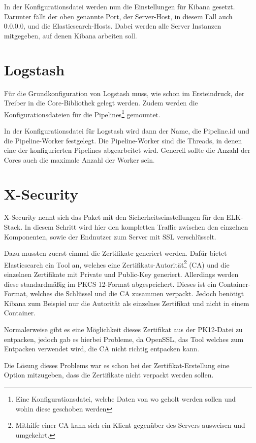 In der Konfigurationsdatei werden nun die Einstellungen für Kibana gesetzt. Darunter fällt der oben genannte Port, der Server-Host, in diesem Fall auch 0.0.0.0, und die Elasticsearch-Hosts. Dabei werden alle Server Instanzen mitgegeben, auf denen Kibana arbeiten soll. 

\section{Logstash}

Für die Grundkonfiguration von Logstash muss, wie schon im Ersteindruck, der Treiber in die Core-Bibliothek gelegt werden. Zudem werden die Konfigurationsdateien für die Pipelines\footnote{Eine Konfigurationsdatei, welche Daten von wo geholt werden sollen und wohin diese geschoben werden} gemountet.

In der Konfigurationsdatei für Logstash wird dann der Name, die Pipeline.id und die Pipeline-Worker festgelegt. Die Pipeline-Worker sind die Threads, in denen eine der konfigurierten Pipelines abgearbeitet wird. Generell sollte die Anzahl der Cores auch die maximale Anzahl der Worker sein.


\section{X-Security}

X-Security nennt sich das Paket mit den Sicherheitseinstellungen für den ELK-Stack. In diesem Schritt wird hier den kompletten Traffic zwischen den einzelnen Komponenten, sowie der Endnutzer zum Server mit SSL verschlüsselt. 

Dazu mussten zuerst einmal die Zertifikate generiert werden. Dafür bietet Elasticsearch ein Tool an, welches eine Zertifikats-Autorität\footnote{Mithilfe einer CA kann sich ein Klient gegenüber des Servers ausweisen und umgekehrt.} (CA) und die einzelnen Zertifikate mit Private und Public-Key generiert. Allerdings werden diese standardmäßig im PKCS 12-Format abgespeichert. Dieses ist ein Container-Format, welches die Schlüssel und die CA zusammen verpackt. Jedoch benötigt Kibana zum Beispiel nur die Autorität als einzelnes Zertifikat und nicht in einem Container.

Normalerweise gibt es eine Möglichkeit dieses Zertifikat aus der PK12-Datei zu entpacken, jedoch gab es hierbei Probleme, da OpenSSL, das Tool welches zum Entpacken verwendet wird, die CA nicht richtig entpacken kann. \cite{nerophon.2018}

Die Lösung dieses Problems war es schon bei der Zertifikat-Erstellung eine Option mitzugeben, dass die Zertifikate nicht verpackt werden sollen. 

